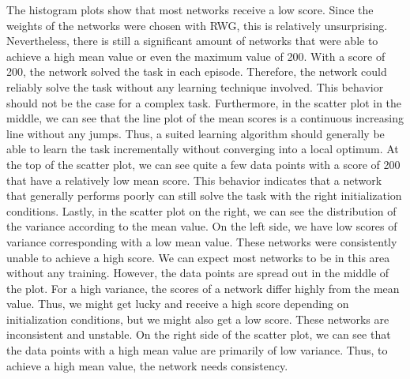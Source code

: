 The histogram plots show that most networks receive a low score. Since the weights of the networks were chosen with RWG, this is relatively unsurprising. Nevertheless, there is still a significant amount of networks that were able to achieve a high mean value or even the maximum value of 200. With a score of 200, the network solved the task in each episode. Therefore, the network could reliably solve the task without any learning technique involved. This behavior should not be the case for a complex task. Furthermore, in the scatter plot in the middle, we can see that the line plot of the mean scores is a continuous increasing line without any jumps. Thus, a suited learning algorithm should generally be able to learn the task incrementally without converging into a local optimum. At the top of the scatter plot, we can see quite a few data points with a score of 200 that have a relatively low mean score. This behavior indicates that a network that generally performs poorly can still solve the task with the right initialization conditions. Lastly, in the scatter plot on the right, we can see the distribution of the variance according to the mean value. On the left side, we have low scores of variance corresponding with a low mean value. These networks were consistently unable to achieve a high score. We can expect most networks to be in this area without any training. However, the data points are spread out in the middle of the plot. For a high variance, the scores of a network differ highly from the mean value. Thus, we might get lucky and receive a high score depending on initialization conditions, but we might also get a low score. These networks are inconsistent and unstable. On the right side of the scatter plot, we can see that the data points with a high mean value are primarily of low variance. Thus, to achieve a high mean value, the network needs consistency.

